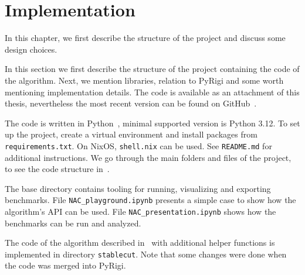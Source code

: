
\chapter{Implementation}%
\label{chapter:impl}

\begin{chapterabstract}

	In this chapter, we first describe the structure of the project
	and discuss some design choices.

\end{chapterabstract}

In this section we first describe the structure of the project containing
the code of the algorithm.
Next, we mention libraries, relation to PyRigi and
some worth mentioning implementation details.
The code is available as an attachment of this thesis,
nevertheless the most recent version can be found on GitHub~\cite{my_code}.

The code is written in Python~\cite{python}, minimal supported version is Python 3.12.
To set up the project, create a virtual environment and install packages
from \texttt{requirements.txt}. On NixOS, \texttt{shell.nix} can be used.
See \texttt{README.md} for additional instructions.
We go through the main folders and files of the project,
to see the code structure in~.

The base directory contains tooling for running, visualizing and exporting benchmarks.
File \texttt{NAC\_playground.ipynb} presents a simple case
to show how the algorithm's API can be used.
File \texttt{NAC\_presentation.ipynb} shows how the benchmarks can be run and analyzed.

The code of the algorithm described in~
with additional helper functions is implemented in directory \texttt{stablecut}.
Note that some changes were done when the code was merged into PyRigi.

